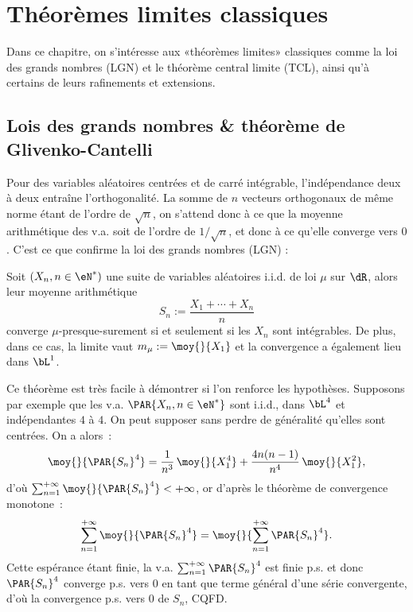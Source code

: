 %
%
\chapter{Théorèmes limites classiques}
%
%

Dans ce chapitre, on s'intéresse aux «théorèmes limites» classiques comme la
loi des grands nombres (LGN) et le théorème central limite (TCL), ainsi qu'à
certains de leurs rafinements et extensions.

%
\section{Lois des grands nombres \& théorème de Glivenko-Cantelli}\label{se:lgn}
%

Pour des variables aléatoires centrées et de carré intégrable, l'indépendance
deux à deux entraîne l'orthogonalité. La somme de $n$ vecteurs orthogonaux de
même norme étant de l'ordre de $\sqrt{n}$, on s'attend donc à ce que la
moyenne arithmétique des v.a. soit de l'ordre de $1/\sqrt{n}$, et donc à ce
qu'elle converge vers $0$. C'est ce que confirme la loi des grands nombres
(LGN) :

\begin{theorem}
  Soit $(X_n,n\in\eN^*)$ une suite de variables aléatoires i.i.d. de loi $\mu$ sur
  $\dR$, alors leur moyenne arithmétique 
  $$
  S_n:=\frac{X_1+\cdots+X_n}{n}
  $$
  converge $\mu$-presque-surement si et seulement si les $X_n$ sont
  intégrables. De plus, dans ce cas, la limite vaut $m_\mu:=\moy{}{X_1}$ et la
  convergence a également lieu dans $\bL^1$.
\end{theorem}

Ce théorème est très facile à démontrer si l'on renforce les hypothèses.
Supposons par exemple que les v.a. $\PAR{X_n,n\in\eN^*}$ sont i.i.d., dans
$\bL^4$ et indépendantes $4$ à $4$. On peut supposer sans perdre de généralité
qu'elles sont centrées. On a alors~:
$$
\moy{}{\PAR{S_n}^4}=\frac{1}{n^3}\,\moy{}{X_1^4}+\frac{4n(n-1)}{n^4}\,\moy{}{X_1^2},
$$
d'où $\sum_{n=1}^{+\infty}\moy{}{\PAR{S_n}^4}<+\infty$, or d'après le théorème
de convergence monotone~:
$$
\sum_{n=1}^{+\infty}\moy{}{\PAR{S_n}^4}
=\moy{}{\sum_{n=1}^{+\infty}\PAR{S_n}^4}.
$$
Cette espérance étant finie, la v.a. $\sum_{n=1}^{+\infty}\PAR{S_n}^4$ est
finie p.s. et donc $\PAR{S_n}^4$ converge p.s. vers $0$ en tant que terme
général d'une série convergente, d'où la convergence p.s. vers $0$ de $S_n$,
CQFD.


